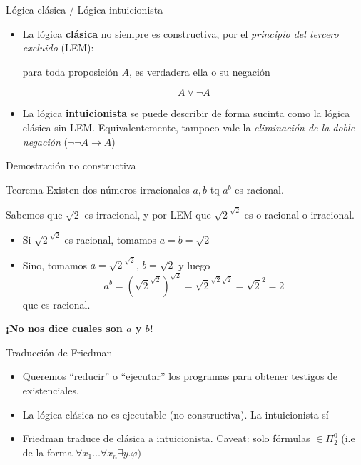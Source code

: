 \documentclass[xcolor={dvipsnames},spanish]{beamer}
\begin{document}
\begin{frame}{Lógica clásica / Lógica intuicionista}
    \begin{itemize}
        \item La lógica \textbf{clásica} no siempre es constructiva, por el \textit{principio del tercero excluido} (LEM): 
        
            \begin{center}
                para toda proposición $A$, es verdadera ella o su negación
            \end{center}
        $$A \vee \neg A$$

        \item La lógica \textbf{intuicionista} se puede describir de forma sucinta como la lógica clásica sin LEM. Equivalentemente, tampoco vale la \textit{eliminación de la doble negación} ($\neg\neg A \rightarrow A$)
    \end{itemize}
\end{frame}

\begin{frame}{Demostración no constructiva}
    \begin{block}{Teorema}
        Existen dos números irracionales $a, b$ tq $a^b$ es racional.
    \end{block}
    
    Sabemos que $\sqrt{2}$ es irracional, y por LEM que $\sqrt{2}^{\sqrt{2}}$ es o racional o irracional.
    \begin{itemize}
        \item Si $\sqrt{2}^{\sqrt{2}}$ es racional, tomamos $a = b = \sqrt{2}$
        \item Sino, tomamos $a = \sqrt{2}^{\sqrt{2}}$, $b = \sqrt{2}$ y luego
        \[a^b
            = (\sqrt{2}^{\sqrt{2}})^{\sqrt{2}}
            = \sqrt{2}^{\sqrt{2} \sqrt{2}}
            = \sqrt{2}^2 = 2
        \]
        que es racional.
    \end{itemize}

    \vspace{1cm}
    \textbf{¡No nos dice cuales son $a$ y $b$!}
\end{frame}


\begin{frame}{Traducción de Friedman}

\begin{itemize}
    \item Queremos ``reducir'' o ``ejecutar'' los programas para obtener testigos de existenciales.
    \item La lógica clásica no es ejecutable (no constructiva). La intuicionista sí
    \item Friedman traduce de clásica a intuicionista. Caveat: solo fórmulas $\in \Pi^0_2$ (i.e de la forma $\forall x_1 \dots \forall x_n \exists y . \varphi)$
\end{itemize}
    
\end{frame}
\end{document}
